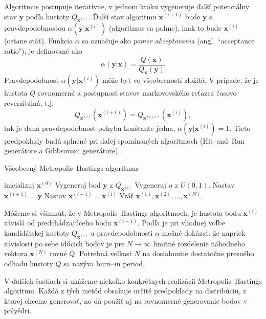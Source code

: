 Algoritmus postupuje iteratívne, v jednom kroku vygeneruje ďalší potenciálny stav $\mathbf y$ podľa hustoty $Q_{\mathbf x^{(i)}}$. Ďalší stav algoritmu $\mathbf x^{(i+1)}$ bude $\mathbf y$ s pravdepodobnosťou $\alpha (\mathbf y|\mathbf x^{(i)})$ (algoritmus sa pohne), inak to bude $\mathbf x^{(i)}$ (ostane stáť). Funkcia $\alpha$ sa označuje ako \textit{pomer akceptovania} (angl. ``acceptance ratio"), je definované ako $$\alpha (\mathbf y|\mathbf x) = \frac {Q(\mathbf x)}{Q_{\mathbf x}(\mathbf y)}$$ 
Pravdepodobnosť $\alpha (\mathbf y|\mathbf x^{(i)})$ môže byť vo všeobecnosti zložitá. V prípade, že je hustota $Q$ rovnomerná a postupnosť stavov markovovského reťazca časovo reverzibilná, t.j. $$Q_{\mathbf x^{(i)}}(\mathbf x^{(i+1)})=Q_{\mathbf x^{(i+1)}}(\mathbf x^{(i)}),$$ tak je daná pravdepodobnosť pohybu konštante jedna, $\alpha (\mathbf y|\mathbf x^{(i)})=1$. Tieto predpoklady budú splnené pri ďalej spomínaných algoritmoch (Hit--and--Run generátore a Gibbsovom generátore).

\begin{algorithm}[H]
	\caption{Všeobecný Metropolis--Hastings algoritmus \cite{metropolis-hastings_chib}}
	\label{metropolis-hastings}
	\begin{algorithmic}[1]
		\State inicializuj $\mathbf x^{(0)}$
			\State Vygeneruj bod $\mathbf y$ z $Q_{\mathbf x^{(i)}}$
			\State Vygeneruj $u$ z $U(0,1)$.
				\State Nastav $\mathbf x^{(i+1)}=\mathbf y$
			\Else
				\State Nastav $\mathbf x^{(i+1)}=\mathbf x^{(i)}$
			\EndIf
		\EndFor
		\State Vráť ${\mathbf x^{(1)},\mathbf x^{(2)},\dots,\mathbf x^{(N)}}$.
	\end{algorithmic}
\end{algorithm}

Môžeme si všimnúť, že v Metropolis--Hastings algoritmoch, je hustota bodu $\mathbf x^{(i)}$ závislá od predchádzajúceho bodu $\mathbf x^{(i-1)}$. Podľa \cite{metropolis-hastings_chib} je pri vhodnej voľbe kandidátskej hustoty $Q_{\mathbf x^{(i)}}$ a pravdepodobnosti $\alpha$ možné dokázať, že napriek závislosti po sebe idúcich bodov je pre $N \rightarrow \infty$ limitné rozdelenie náhodneho vektora $\mathbf x^{(N)}$ rovné $Q$. Potrebná veľkosť $N$ na dosiahnutie dostatočne presného odhadu hustoty $Q$ sa nazýva burn--in period.

V ďalších častiach si ukážeme niekoľko konkrétnych realizácii Metropolis--Hastings algoritmu. Každá z tých metód obsahuje určité predpoklady na distribúciu, z ktorej chceme generovať, no dá použiť aj na rovnomerné generovanie bodov v polyédri.